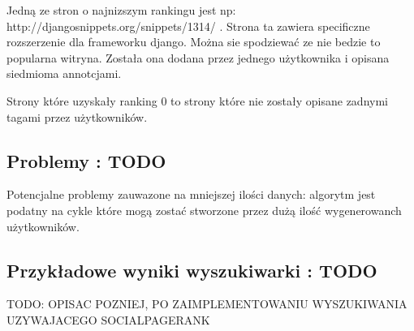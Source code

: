 Jedną ze stron o najnizszym rankingu jest np: http://djangosnippets.org/snippets/1314/ . Strona ta zawiera specificzne rozszerzenie dla frameworku django. Można sie spodziewać ze nie bedzie to popularna witryna. Została ona dodana przez jednego użytkownika i opisana siedmioma annotcjami.

Strony które uzyskały ranking 0 to strony które nie zostały opisane zadnymi tagami przez użytkowników. 

\subsection{Problemy : TODO}
Potencjalne problemy zauwazone na mniejszej ilości danych: algorytm jest podatny na cykle które mogą zostać stworzone przez dużą ilość wygenerowanch użytkowników.

\subsection{Przykładowe wyniki wyszukiwarki : TODO} 

TODO: OPISAC POZNIEJ, PO ZAIMPLEMENTOWANIU WYSZUKIWANIA UZYWAJACEGO SOCIALPAGERANK 











